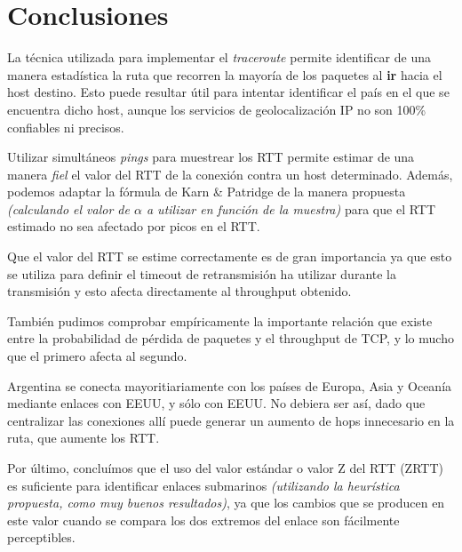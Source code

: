 \section{Conclusiones}

La técnica utilizada para implementar el \textit{traceroute} permite identificar de una manera estadística la ruta que recorren la mayoría de los paquetes al \textbf{ir} hacia el host destino. Esto puede resultar útil para intentar identificar el país en el que se encuentra dicho host, aunque los servicios de geolocalización IP no son 100\% confiables ni precisos.


Utilizar simultáneos \textit{pings} para muestrear los RTT permite estimar de una manera \textit{fiel} el valor del RTT de la conexión contra un host determinado. Además, podemos adaptar la fórmula de Karn \& Patridge de la manera propuesta \textit{(calculando el valor de $\alpha$ a utilizar en función de la muestra)} para que el RTT estimado no sea afectado por picos en el RTT.

Que el valor del RTT se estime correctamente es de gran importancia ya que esto se utiliza para definir el timeout de retransmisión ha utilizar durante la transmisión y esto afecta directamente al throughput obtenido.


También pudimos comprobar empíricamente la importante relación que existe entre la probabilidad de pérdida de paquetes y el throughput de TCP, y lo mucho que el primero afecta al segundo.


Argentina se conecta mayoritiariamente con los países de Europa, Asia y Oceanía mediante enlaces con EEUU, y sólo con EEUU. No debiera ser así, dado que centralizar las conexiones allí puede generar un aumento de hops innecesario en la ruta, que aumente los RTT.


Por último, concluímos que el uso del valor estándar o valor Z del RTT (ZRTT) es suficiente para identificar enlaces submarinos \textit{(utilizando la heurística propuesta, como muy buenos resultados)}, ya que los cambios que se producen en este valor cuando se compara los dos extremos del enlace son fácilmente perceptibles.
